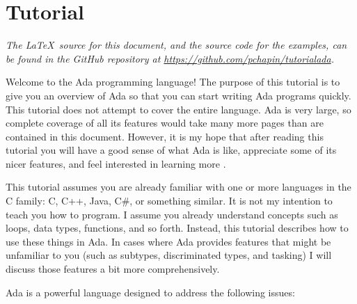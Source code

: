 
\chapter{Tutorial}
\label{chapt:tutorial}

\textit{The \LaTeX\ source for this document, and the source code for the examples, can be found
in the GitHub repository at \url{https://github.com/pchapin/tutorialada}.}

Welcome to the Ada programming language! The purpose of this tutorial is to give you an overview
of Ada so that you can start writing Ada programs quickly. This tutorial does not attempt to
cover the entire language. Ada is very large, so complete coverage of all its features would
take many more pages than are contained in this document. However, it is my hope that after
reading this tutorial you will have a good sense of what Ada is like, appreciate some of its
nicer features, and feel interested in learning more
\cite{Barnes2014,McCormick2011,Ben-Ari2009,Burns2007,Dale2007}.

This tutorial assumes you are already familiar with one or more languages in the C family: C,
C++, Java, C\#, or something similar. It is not my intention to teach you how to program. I
assume you already understand concepts such as loops, data types, functions, and so forth.
Instead, this tutorial describes how to use these things in Ada. In cases where Ada provides
features that might be unfamiliar to you (such as subtypes, discriminated types, and tasking) I
will discuss those features a bit more comprehensively.

Ada is a powerful language designed to address the following issues:


